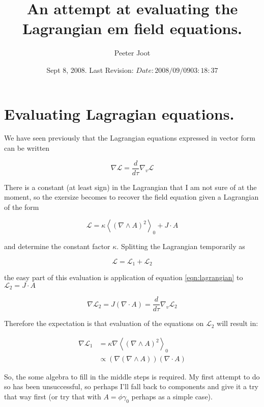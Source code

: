 \documentclass{article}
\title{ An attempt at evaluating the Lagrangian em field equations. }
\author{Peeter Joot}
\date{ Sept 8, 2008.  Last Revision: $Date: 2008/09/09 03:18:37 $ }
\newcommand{\LL}[0]{\mathcal{L}}
\newcommand{\gpgrade}[2] {{\left\langle{{#1}}\right\rangle}_{#2}}
\newcommand{\gpgradezero}[1] {\gpgrade{#1}{0}}
\newcommand{\grad}[0]{\nabla}
\begin{document}
\maketitle{}

\section{ Evaluating Lagragian equations. }

We have seen previously that the Lagrangian equations expressed in vector 
form can be written

\begin{equation}\label{eqn:lagrangian}
\grad \LL = \frac{d}{d\tau} \grad_v \LL
\end{equation}

There is a constant (at least sign) in the Lagrangian that I am not sure of
at the moment, so the exersize becomes to recover the field equation 
given a Lagrangian of the form

\begin{equation*}
\LL = \kappa \gpgradezero{ (\grad \wedge A)^2 } + J \cdot A
\end{equation*}

and determine the constant factor $\kappa$.  Splitting the Lagrangian temporarily as

\begin{equation*}
\LL = \LL_1 + \LL_2
\end{equation*}

the easy part of this evaluation is application of equation \ref{eqn:lagrangian} to $\LL_2 = J \cdot A$

\begin{equation}\label{eqn:maybewrong}
\grad \LL_2 = J (\grad \cdot A) = \frac{d}{d\tau} \grad_v \LL_2
\end{equation}

Therefore the expectation is that evaluation of the equations on $\LL_2$ will 
result in:

\begin{align*}
\grad \LL_1 
&= \kappa \grad \gpgradezero{ (\grad \wedge A)^2 } \\
&\propto (\grad (\grad \wedge A)) (\grad \cdot A)
\end{align*}

So, the some algebra to fill in the middle steps is required.  My
first attempt to do so has been unsuccessful, so perhaps I'll fall back
to components and give it a try that way first (or try that with $A = \phi \gamma_0$ perhaps as a simple case).
\end{document}
